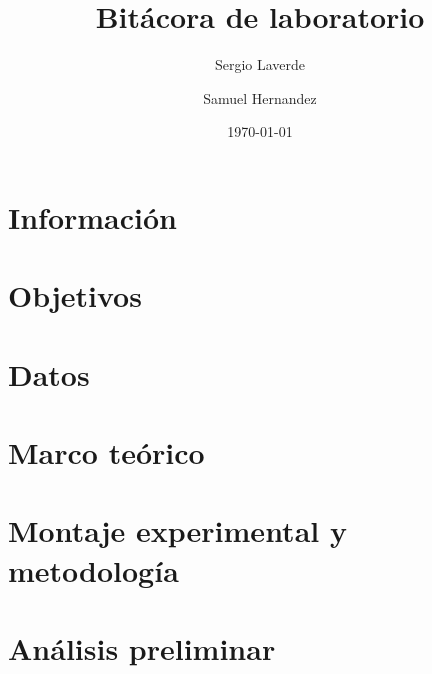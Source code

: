 \documentclass[a4paper, reprint, showkeys, nofootinbib, twoside]{revtex4-1}
\begin{document}
\title{Bitácora de laboratorio}


\author{Sergio Laverde}

\author{Samuel Hernandez}


\date{\today}


\maketitle

\section{Información}

\section{Objetivos}

\section{Datos}

\section{Marco teórico}

\section{Montaje experimental y metodología}

\section{Análisis preliminar}



\end{document}
